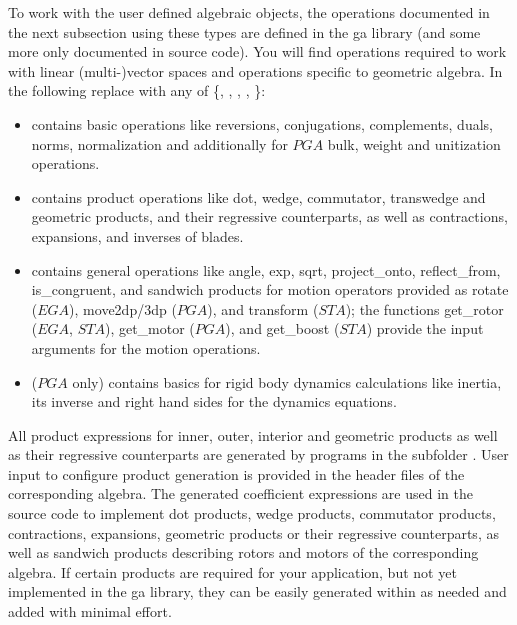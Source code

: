 To work with the user defined algebraic objects, the operations documented in the next
subsection using these types are defined in the ga library (and some more only documented
in source code). You will find operations required to work with linear (multi-)vector
spaces and operations specific to geometric algebra. In the following replace
 with any of \{, , , ,
\}:
\begin{itemize}
\item {} contains basic operations like reversions,
conjugations, complements, duals,  norms, normalization and additionally for $PGA$ bulk,
weight and unitization operations.
\item {} contains product operations like dot, wedge,
commutator, transwedge and geometric products, and their regressive counterparts, as well
as contractions, expansions, and inverses of blades.
\item {} contains general operations like angle, exp, sqrt,
project\_onto, reflect\_from, is\_congruent, and sandwich products for motion operators
provided as rotate ($EGA$), move2dp/3dp ($PGA$), and transform ($STA$); the functions
get\_rotor ($EGA$, $STA$), get\_motor ($PGA$), and get\_boost ($STA$) provide the input
arguments for the motion operations.
\item {} ($PGA$ only) contains basics for rigid body
dynamics calculations like inertia, its inverse and right hand sides for the dynamics
equations.
\end{itemize}



All product expressions for inner, outer, interior and geometric products as well as their
regressive counterparts are generated by programs in the subfolder .
User input to configure product generation is provided in the header files of the
corresponding algebra. The generated coefficient expressions are used in the source code
to implement dot products, wedge products, commutator products, contractions, expansions,
geometric products or their regressive counterparts, as well as sandwich products
describing rotors and motors of the corresponding algebra. If certain products are
required for your application, but not yet implemented in the ga library, they can be
easily generated within  as needed and added with minimal
effort. \\

